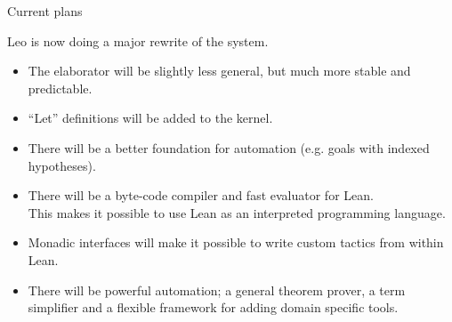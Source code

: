 \documentclass[xcolor=table]{beamer}
\begin{document}
\begin{frame}{Current plans}

Leo is now doing a major rewrite of the system.
\begin{itemize}
\item The elaborator will be slightly less general, but much more stable and predictable.
\item ``Let'' definitions will be added to the kernel.
\item There will be a better foundation for automation (e.g. goals with indexed hypotheses).
\item There will be a byte-code compiler and fast evaluator for Lean.\\
 This makes it possible to use Lean as an interpreted programming language.
\item Monadic interfaces will make it possible to write custom tactics from within Lean.
\item There will be powerful automation; a general theorem prover, a term simplifier and a flexible framework for adding domain specific tools.
\end{itemize}

\end{frame}



\end{document}
